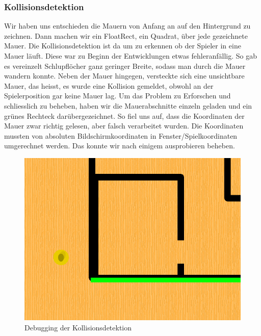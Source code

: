 \documentclass[12pt,a4paper]{scrartcl}
\begin{document}
\subsubsection{Kollisionsdetektion}
Wir haben uns entschieden die Mauern von Anfang an auf den Hintergrund zu zeichnen. Dann machen wir ein FloatRect, ein Quadrat,
über jede gezeichnete Mauer. Die Kollisionsdetektion ist da um zu erkennen ob der Spieler in eine Mauer läuft.
Diese war zu Beginn der Entwicklungen etwas fehleranfällig. So gab es vereinzelt
Schlupflöcher ganz geringer Breite, sodass man durch die Mauer wandern konnte. Neben der Mauer hingegen,
versteckte sich eine unsichtbare Mauer, das heisst, es wurde eine Kollision gemeldet, obwohl an der
Spielerposition gar keine Mauer lag. Um das Problem zu Erforschen und schliesslich zu beheben, haben
wir die Mauerabschnitte einzeln geladen und ein grünes Rechteck darübergezeichnet. So fiel uns auf, dass
die Koordinaten der Mauer zwar richtig gelesen, aber falsch verarbeitet wurden. Die Koordinaten mussten
von absoluten Bildschirmkoordinaten in Fenster/Spielkoordinaten umgerechnet werden. Das konnte wir nach einigem ausprobieren beheben.

\begin{figure}[h]
\centering
\includegraphics[scale=0.3]{img/kollisionsdetektion.png}
\caption{Debugging der Kollisionsdetektion}
\end{figure}
\end{document}
